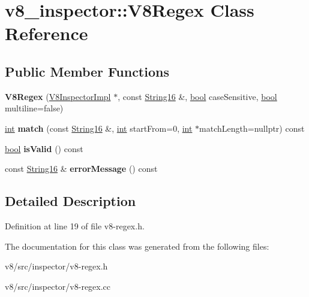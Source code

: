 \hypertarget{classv8__inspector_1_1V8Regex}{}\section{v8\+\_\+inspector\+:\+:V8\+Regex Class Reference}
\label{classv8__inspector_1_1V8Regex}
\subsection*{Public Member Functions}
\begin{DoxyCompactItemize}
\item 
\mbox{\label{classv8__inspector_1_1V8Regex_a1e7b3b652c80c76b55e9c0e2c925ea9b}} 
{\bfseries V8\+Regex} (\mbox{\hyperlink{classv8__inspector_1_1V8InspectorImpl}{V8\+Inspector\+Impl}} $\ast$, const \mbox{\hyperlink{classv8__inspector_1_1String16}{String16}} \&, \mbox{\hyperlink{classbool}{bool}} case\+Sensitive, \mbox{\hyperlink{classbool}{bool}} multiline=false)
\item 
\mbox{\label{classv8__inspector_1_1V8Regex_a918a2cb77c70bb6b8d7280cb2cb0f8d9}} 
\mbox{\hyperlink{classint}{int}} {\bfseries match} (const \mbox{\hyperlink{classv8__inspector_1_1String16}{String16}} \&, \mbox{\hyperlink{classint}{int}} start\+From=0, \mbox{\hyperlink{classint}{int}} $\ast$match\+Length=nullptr) const
\item 
\mbox{\label{classv8__inspector_1_1V8Regex_ab2ed1c0e4d462d36094561f0c7939d86}} 
\mbox{\hyperlink{classbool}{bool}} {\bfseries is\+Valid} () const
\item 
\mbox{\label{classv8__inspector_1_1V8Regex_a7388d71a43ae4da49487bf6d2f3b0900}} 
const \mbox{\hyperlink{classv8__inspector_1_1String16}{String16}} \& {\bfseries error\+Message} () const
\end{DoxyCompactItemize}


\subsection{Detailed Description}


Definition at line 19 of file v8-\/regex.\+h.



The documentation for this class was generated from the following files\+:\begin{DoxyCompactItemize}
\item 
v8/src/inspector/v8-\/regex.\+h\item 
v8/src/inspector/v8-\/regex.\+cc\end{DoxyCompactItemize}

